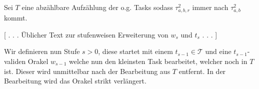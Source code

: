 \documentclass[nofonts]{uebung}
\begin{document}
Sei $T$ eine abzählbare Aufzählung der o.g. Tasks sodass $\tau^2_{a,b,r}$ immer nach $\tau^2_{a,b}$ kommt.

[ . . . Üblicher Text zur stufenweisen Erweiterung von $w_s$ und $t_s$ . . . ]

Wir definieren nun Stufe $s>0$, diese startet mit einem $t_{s-1}\in\mathcal T$ und eine $t_{s-1}$-validen Orakel $w_{s-1}$ welche nun den kleinsten Task bearbeitet, welcher noch in $T$ ist. Dieser wird unmittelbar nach der Bearbeitung aus $T$ entfernt. In der Bearbeitung wird das Orakel strikt verlängert.
\end{document}
